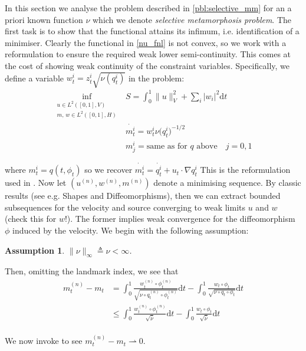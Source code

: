 \documentclass{article}
\newtheorem{assumption}{Assumption}
\newcommand{\norm}[2]{\| #1 \|_{ #2 }}
\newcommand{\vnorm}[1]{\norm{ #1 }{V}}
\newcommand{\diff}[1]{\text{d} #1}
\begin{document}
In this section we analyse the problem described in \eqref{pbl:selective_mm} for
an a priori known function $\nu$ which we denote \emph{selective metamorphosis
problem}. The first task is to show that the functional attains its infimum,
i.e. identification of a minimiser. Clearly the functional in \eqref{nu_fnl} is
not convex, so we work with a reformulation to ensure the required weak lower
semi-continuity. This comes at the cost of showing weak continuity of the
constraint variables. Specifically, we define a variable $w^i_t = z^i_t
\sqrt{\nu(q_t^i)}$ in the problem:
\begin{subequations}
\begin{align}
\inf_{\substack{u\in L^2([0,1],V)\\m,\, w \in L^2([0,1],H)}} & S =
\int_0^1\vnorm{u}^2 + \sum_i |w_i|^2 \diff{t}\\
    & \dot{m^i_t} = w^i_t {\nu(q_t^i})^{-1/2}\\
    & m^i_j = \text{same as for $q$ above}\quad j=0,1
\end{align}
\end{subequations}

where $m^i_t = q(t, \phi_t)$ so we recover $\dot{m^i_t} = \dot{q^i_t} + u_t
\cdot \nabla q^i_t$ This is the reformulation used in \cite[Theorem
1]{richardson2016metamorphosis}. Now let $(u^{(n)}, w^{(n)}, m^{(n)})$ denote a
minimising sequence. By classic results (see e.g.  Shapes and Diffeomorphisms),
then we can extract bounded subsequences for the velocity and source converging
to weak limits $u$ and $w$ (check this for $w$!). The former implies weak
convergence for the diffeomorphism $\phi$ induced by the velocity. We begin with
the following assumption:
\begin{assumption}
$\|\nu\|_\infty \triangleq \hat \nu <\infty$.
\end{assumption}

Then, omitting the landmark index, we see that\\
\begin{align*}
m_t^{(n)} - m_t & = 
\int_0^1\frac{w_t^{(n)}\circ\phi_t^{(n)}}{\sqrt{\nu\circ q_t^{(n)}\circ\phi_t^{(n)}}}
\diff{t} - \int_0^1\frac{w_t\circ\phi_t}{\sqrt{\nu\circ q_t\circ\phi_t}}
\diff{t}\\
& \leq \int_0^1\frac{w_t^{(n)}\circ\phi_t^{(n)}}{\sqrt{\hat \nu}}
\diff{t} - \int_0^1\frac{w_t\circ\phi_t}{\sqrt{\hat \nu}} \diff{t}\\
\end{align*}

We now invoke \cite[Theorem 1]{richardson2016metamorphosis} to see $m_t^{(n)} -
m_t \rightharpoonup 0$.
\end{document}
